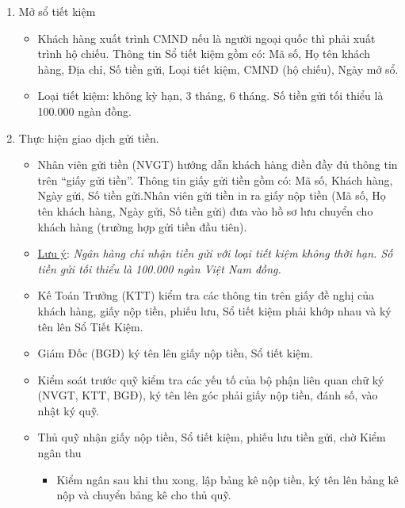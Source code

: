 \documentclass{article}
\begin{document}
		\begin{enumerate}
			
			\newpage
			
			\item Mở sổ tiết kiệm
			
			\begin{itemize}
				\item Khách hàng xuất trình CMND nếu là người ngoại quốc thì phải xuất trình hộ chiếu. Thông tin Sổ tiết kiệm gồm có: Mã số, Họ tên khách hàng, Địa chỉ, Số tiền gửi, Loại tiết kiệm, CMND (hộ chiếu), Ngày mở sổ.
				
				\item Loại tiết kiệm: không kỳ hạn, 3 tháng, 6 tháng. Số tiền gửi tối thiểu là 100.000 ngàn đồng.
			\end{itemize}
			
			\item Thực hiện giao dịch gửi tiền.
			\begin{itemize}
				\item Nhân viên gửi tiền (NVGT) hướng dẫn khách hàng điền đầy đủ thông tin trên “giấy gửi tiền”. Thông tin giấy gửi tiền gồm có: Mã số, Khách hàng, Ngày gửi, Số tiền gửi.Nhân viên gửi tiền in ra giấy nộp tiền (Mã số, Họ tên khách hàng, Ngày gửi, Số tiền gửi) đưa vào hồ sơ lưu chuyển cho khách hàng (trường hợp gửi tiền đầu tiên).
				
				\item \underline{Lưu ý}: \textit{Ngân hàng chỉ nhận tiền gửi với loại tiết kiệm không thời hạn. Số tiền gửi tối thiểu là 100.000 ngàn Việt Nam đồng.}
				
				\item Kế Toán Trưởng (KTT) kiểm tra các thông tin trên giấy đề nghị của khách hàng, giấy nộp tiền, phiếu lưu, Sổ tiết kiệm phải khớp nhau và ký tên lên Sổ Tiết Kiệm.
				
				\item Giám Đốc (BGĐ) ký tên lên giấy nộp tiền, Sổ tiết kiệm.
				
				\item Kiểm soát trước quỹ kiểm tra các yếu tố của bộ phận liên quan chữ ký (NVGT, KTT, BGĐ), ký tên lên góc phải giấy nộp tiền, đánh số, vào nhật ký quỹ.
				
				\item Thủ quỹ nhận giấy nộp tiền, Sổ tiết kiệm, phiếu lưu tiền gửi, chờ Kiểm ngân thu
				
					\begin{itemize}
						\item Kiểm ngân sau khi thu xong, lập bảng kê nộp tiền, ký tên lên bảng kê nộp và chuyển bảng kê cho thủ quỹ.
						

\end{itemize}
\end{itemize}
\end{enumerate}
\end{document}

